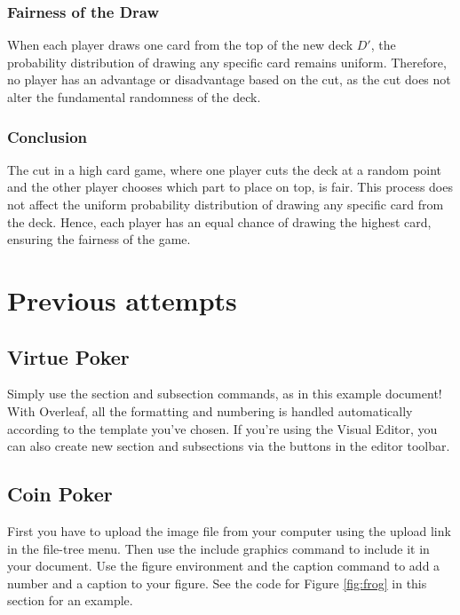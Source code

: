 \documentclass{article}
\begin{document}
\subsubsection*{Fairness of the Draw}

When each player draws one card from the top of the new deck \( D' \), the probability distribution of drawing any specific card remains uniform. Therefore, no player has an advantage or disadvantage based on the cut, as the cut does not alter the fundamental randomness of the deck.

\subsubsection*{Conclusion}

The cut in a high card game, where one player cuts the deck at a random point and the other player chooses which part to place on top, is fair. This process does not affect the uniform probability distribution of drawing any specific card from the deck. Hence, each player has an equal chance of drawing the highest card, ensuring the fairness of the game.

\section{Previous attempts}

\subsection{Virtue Poker}

Simply use the section and subsection commands, as in this example document! With Overleaf, all the formatting and numbering is handled automatically according to the template you've chosen. If you're using the Visual Editor, you can also create new section and subsections via the buttons in the editor toolbar.

\subsection{Coin Poker}

First you have to upload the image file from your computer using the upload link in the file-tree menu. Then use the include graphics command to include it in your document. Use the figure environment and the caption command to add a number and a caption to your figure. See the code for Figure \ref{fig:frog} in this section for an example.
\end{document}
